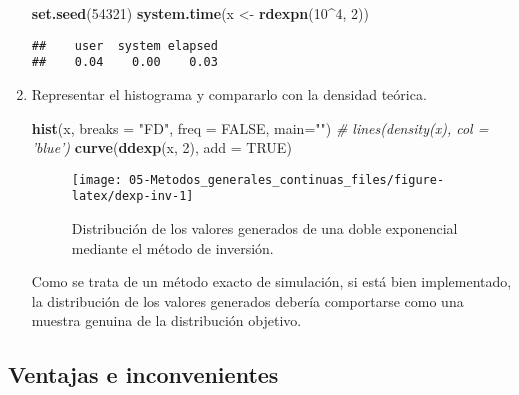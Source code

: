 \documentclass[
]{book}
\newenvironment{Shaded}{\begin{snugshade}}{\end{snugshade}}
\newcommand{\CommentTok}[1]{\textcolor[rgb]{0.56,0.35,0.01}{\textit{#1}}}
\newcommand{\DataTypeTok}[1]{\textcolor[rgb]{0.13,0.29,0.53}{#1}}
\newcommand{\DecValTok}[1]{\textcolor[rgb]{0.00,0.00,0.81}{#1}}
\newcommand{\KeywordTok}[1]{\textcolor[rgb]{0.13,0.29,0.53}{\textbf{#1}}}
\newcommand{\NormalTok}[1]{#1}
\newcommand{\OperatorTok}[1]{\textcolor[rgb]{0.81,0.36,0.00}{\textbf{#1}}}
\newcommand{\OtherTok}[1]{\textcolor[rgb]{0.56,0.35,0.01}{#1}}
\newcommand{\StringTok}[1]{\textcolor[rgb]{0.31,0.60,0.02}{#1}}
\theoremstyle{break}
\theoremstyle{definition}
\theoremstyle{definition}
\theoremstyle{definition}
\theoremstyle{remark}
\begin{document}
\begin{enumerate}
\begin{Shaded}
\begin{Highlighting}[]
\KeywordTok{set.seed}\NormalTok{(}\DecValTok{54321}\NormalTok{)}
\KeywordTok{system.time}\NormalTok{(x <-}\StringTok{ }\KeywordTok{rdexpn}\NormalTok{(}\DecValTok{10}\OperatorTok{^}\DecValTok{4}\NormalTok{, }\DecValTok{2}\NormalTok{))}
\end{Highlighting}
\end{Shaded}

\begin{verbatim}
##    user  system elapsed 
##    0.04    0.00    0.03
\end{verbatim}
\item
  Representar el histograma y compararlo con la densidad teórica.

\begin{Shaded}
\begin{Highlighting}[]
\KeywordTok{hist}\NormalTok{(x, }\DataTypeTok{breaks =} \StringTok{"FD"}\NormalTok{, }\DataTypeTok{freq =} \OtherTok{FALSE}\NormalTok{, }\DataTypeTok{main=}\StringTok{""}\NormalTok{)}
\CommentTok{# lines(density(x), col = 'blue')}
\KeywordTok{curve}\NormalTok{(}\KeywordTok{ddexp}\NormalTok{(x, }\DecValTok{2}\NormalTok{), }\DataTypeTok{add =} \OtherTok{TRUE}\NormalTok{)}
\end{Highlighting}
\end{Shaded}

  \begin{figure}[!htb]

  {\centering \texttt{[image: 05-Metodos\_generales\_continuas\_files/figure-latex/dexp-inv-1]} 

  }

  \caption{Distribución de los valores generados de una doble exponencial mediante el método de inversión.}\label{fig:dexp-inv}
  \end{figure}

  Como se trata de un método exacto de simulación, si está bien implementado, la distribución de los valores generados debería comportarse como una muestra genuina de la distribución objetivo.
\end{enumerate}

\hypertarget{ventajas-e-inconvenientes}{%
\subsection{Ventajas e inconvenientes}\label{ventajas-e-inconvenientes}}
\end{document}

